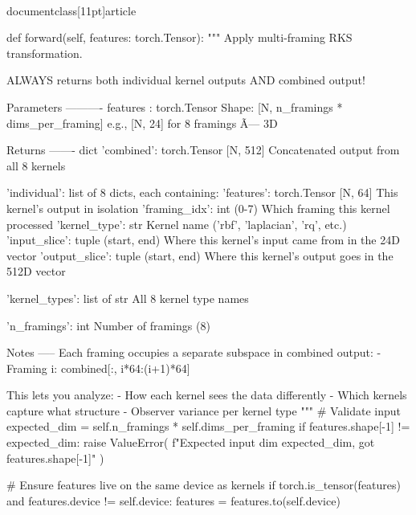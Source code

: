 \\documentclass[11pt]{article}
\begin{document}
\begin{CodeBlock}
    def forward(self, features: torch.Tensor):
        """
        Apply multi-framing RKS transformation.
        
        ALWAYS returns both individual kernel outputs AND combined output!
        
        Parameters
        ----------
        features : torch.Tensor
            Shape: [N, n_framings * dims_per_framing]
            e.g., [N, 24] for 8 framings Ã— 3D
        
        Returns
        -------
        dict
            'combined': torch.Tensor [N, 512]
                Concatenated output from all 8 kernels
            
            'individual': list of 8 dicts, each containing:
                'features': torch.Tensor [N, 64]
                    This kernel's output in isolation
                'framing_idx': int (0-7)
                    Which framing this kernel processed
                'kernel_type': str
                    Kernel name ('rbf', 'laplacian', 'rq', etc.)
                'input_slice': tuple (start, end)
                    Where this kernel's input came from in the 24D vector
                'output_slice': tuple (start, end)
                    Where this kernel's output goes in the 512D vector
            
            'kernel_types': list of str
                All 8 kernel type names
            
            'n_framings': int
                Number of framings (8)
            
        Notes
        -----
        Each framing occupies a separate subspace in combined output:
        - Framing i: combined[:, i*64:(i+1)*64]
        
        This lets you analyze:
        - How each kernel sees the data differently
        - Which kernels capture what structure
        - Observer variance per kernel type
        """
        # Validate input
        expected_dim = self.n_framings * self.dims_per_framing
        if features.shape[-1] != expected_dim:
            raise ValueError(
                f"Expected input dim {expected_dim}, got {features.shape[-1]}"
            )
        
        # Ensure features live on the same device as kernels
        if torch.is_tensor(features) and features.device != self.device:
            features = features.to(self.device)


\end{CodeBlock}
\end{document}
